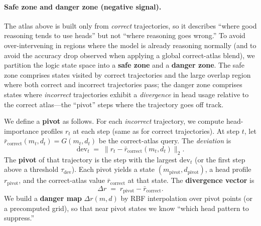 \documentclass{article}
\begin{document}
\paragraph{Safe zone and danger zone (negative signal).}
The atlas above is built only from \emph{correct} trajectories, so it describes ``where good reasoning tends to use heads'' but not ``where reasoning goes wrong.'' To avoid over-intervening in regions where the model is already reasoning normally (and to avoid the accuracy drop observed when applying a global correct-atlas blend), we partition the logic state space into a \textbf{safe zone} and a \textbf{danger zone}. The safe zone comprises states visited by correct trajectories and the large overlap region where both correct and incorrect trajectories pass; the danger zone comprises states where \emph{incorrect} trajectories exhibit a \emph{divergence} in head usage relative to the correct atlas---the ``pivot'' steps where the trajectory goes off track.

We define a \textbf{pivot} as follows. For each \emph{incorrect} trajectory, we compute head-importance profiles $r_t$ at each step (same as for correct trajectories). At step $t$, let $\bar r_{\mathrm{correct}}(m_t,d_t) = G(m_t,d_t)$ be the correct-atlas query. The \emph{deviation} is
\begin{equation}
\mathrm{dev}_t \;=\; \bigl\| r_t - \bar r_{\mathrm{correct}}(m_t,d_t) \bigr\|_2.
\label{eq:deviation}
\end{equation}
The \textbf{pivot} of that trajectory is the step with the largest $\mathrm{dev}_t$ (or the first step above a threshold $\tau_{\mathrm{dev}}$). Each pivot yields a state $(m_{\mathrm{pivot}}, d_{\mathrm{pivot}})$, a head profile $r_{\mathrm{pivot}}$, and the correct-atlas value $\bar r_{\mathrm{correct}}$ at that state. The \textbf{divergence vector} is
\begin{equation}
\Delta r \;=\; r_{\mathrm{pivot}} - \bar r_{\mathrm{correct}}.
\label{eq:delta_r}
\end{equation}
We build a \textbf{danger map} $\Delta r(m,d)$ by RBF interpolation over pivot points (or a precomputed grid), so that near pivot states we know ``which head pattern to suppress.''
\end{document}
